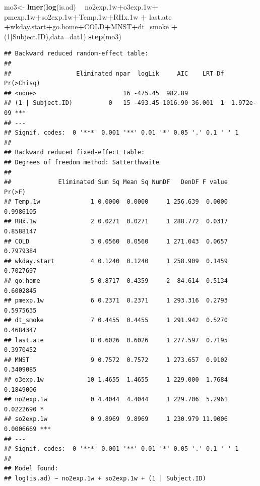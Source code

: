 \documentclass[12pt,]{article}
\newenvironment{Shaded}{\begin{snugshade}}{\end{snugshade}}
\newcommand{\DataTypeTok}[1]{\textcolor[rgb]{0.13,0.29,0.53}{#1}}
\newcommand{\DecValTok}[1]{\textcolor[rgb]{0.00,0.00,0.81}{#1}}
\newcommand{\FloatTok}[1]{\textcolor[rgb]{0.00,0.00,0.81}{#1}}
\newcommand{\KeywordTok}[1]{\textcolor[rgb]{0.13,0.29,0.53}{\textbf{#1}}}
\newcommand{\NormalTok}[1]{#1}
\newcommand{\OperatorTok}[1]{\textcolor[rgb]{0.81,0.36,0.00}{\textbf{#1}}}
\newcommand{\StringTok}[1]{\textcolor[rgb]{0.31,0.60,0.02}{#1}}
\begin{document}
\begin{Shaded}
\begin{Highlighting}[]
\NormalTok{mo3<-}\StringTok{ }\KeywordTok{lmer}\NormalTok{(}\KeywordTok{log}\NormalTok{(is.ad) }\OperatorTok{~}\StringTok{ }\NormalTok{no2exp}\FloatTok{.1}\NormalTok{w}\OperatorTok{+}\NormalTok{o3exp}\FloatTok{.1}\NormalTok{w}\OperatorTok{+}\StringTok{ }\NormalTok{pmexp}\FloatTok{.1}\NormalTok{w}\OperatorTok{+}\NormalTok{so2exp}\FloatTok{.1}\NormalTok{w}\OperatorTok{+}\NormalTok{Temp}\FloatTok{.1}\NormalTok{w}\OperatorTok{+}\NormalTok{RHx}\FloatTok{.1}\NormalTok{w }\OperatorTok{+}\StringTok{ }\NormalTok{last.ate }\OperatorTok{+}\NormalTok{wkday.start}\OperatorTok{+}\NormalTok{go.home}\OperatorTok{+}\NormalTok{COLD}\OperatorTok{+}\NormalTok{MNST}\OperatorTok{+}\NormalTok{dt_smoke }\OperatorTok{+}\NormalTok{(}\DecValTok{1}\OperatorTok{|}\NormalTok{Subject.ID),}\DataTypeTok{data=}\NormalTok{dat1)}
\KeywordTok{step}\NormalTok{(mo3)}
\end{Highlighting}
\end{Shaded}

\begin{verbatim}
## Backward reduced random-effect table:
## 
##                  Eliminated npar  logLik     AIC    LRT Df Pr(>Chisq)    
## <none>                        16 -475.45  982.89                         
## (1 | Subject.ID)          0   15 -493.45 1016.90 36.001  1  1.972e-09 ***
## ---
## Signif. codes:  0 '***' 0.001 '**' 0.01 '*' 0.05 '.' 0.1 ' ' 1
## 
## Backward reduced fixed-effect table:
## Degrees of freedom method: Satterthwaite 
## 
##             Eliminated Sum Sq Mean Sq NumDF   DenDF F value    Pr(>F)    
## Temp.1w              1 0.0000  0.0000     1 256.639  0.0000 0.9986105    
## RHx.1w               2 0.0271  0.0271     1 288.772  0.0317 0.8588147    
## COLD                 3 0.0560  0.0560     1 271.043  0.0657 0.7979384    
## wkday.start          4 0.1240  0.1240     1 258.909  0.1459 0.7027697    
## go.home              5 0.8717  0.4359     2  84.614  0.5134 0.6002845    
## pmexp.1w             6 0.2371  0.2371     1 293.316  0.2793 0.5975635    
## dt_smoke             7 0.4455  0.4455     1 291.942  0.5270 0.4684347    
## last.ate             8 0.6026  0.6026     1 277.597  0.7195 0.3970452    
## MNST                 9 0.7572  0.7572     1 273.657  0.9102 0.3409085    
## o3exp.1w            10 1.4655  1.4655     1 229.000  1.7684 0.1849006    
## no2exp.1w            0 4.4044  4.4044     1 229.706  5.2961 0.0222690 *  
## so2exp.1w            0 9.8969  9.8969     1 230.979 11.9006 0.0006669 ***
## ---
## Signif. codes:  0 '***' 0.001 '**' 0.01 '*' 0.05 '.' 0.1 ' ' 1
## 
## Model found:
## log(is.ad) ~ no2exp.1w + so2exp.1w + (1 | Subject.ID)
\end{verbatim}
\end{document}
